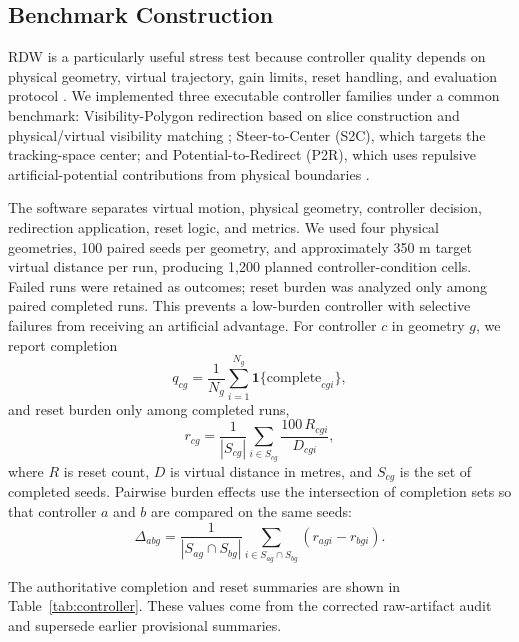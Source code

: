 \subsection{Benchmark Construction}
RDW is a particularly useful stress test because controller quality depends on physical geometry, virtual trajectory, gain limits, reset handling, and evaluation protocol \cite{Li2022RDWReview,Fan2023RDWReview}. We implemented three executable controller families under a common benchmark: Visibility-Polygon redirection based on slice construction and physical/virtual visibility matching \cite{Williams2021VisibilityPolygons}; Steer-to-Center (S2C), which targets the tracking-space center; and Potential-to-Redirect (P2R), which uses repulsive artificial-potential contributions from physical boundaries \cite{Thomas2019P2R,Bachmann2019APF}.

The software separates virtual motion, physical geometry, controller decision, redirection application, reset logic, and metrics. We used four physical geometries, 100 paired seeds per geometry, and approximately 350 m target virtual distance per run, producing 1,200 planned controller-condition cells. Failed runs were retained as outcomes; reset burden was analyzed only among paired completed runs. This prevents a low-burden controller with selective failures from receiving an artificial advantage. For controller $c$ in geometry $g$, we report completion
\begin{equation}
q_{cg}=\frac{1}{N_g}\sum_{i=1}^{N_g}\mathbf{1}\{\mathrm{complete}_{cgi}\},
\end{equation}
and reset burden only among completed runs,
\begin{equation}
r_{cg}=\frac{1}{|S_{cg}|}\sum_{i\in S_{cg}}\frac{100\,R_{cgi}}{D_{cgi}},
\end{equation}
where $R$ is reset count, $D$ is virtual distance in metres, and $S_{cg}$ is the set of completed seeds. Pairwise burden effects use the intersection of completion sets so that controller $a$ and $b$ are compared on the same seeds:
\begin{equation}
\Delta_{abg}=\frac{1}{|S_{ag}\cap S_{bg}|}\sum_{i\in S_{ag}\cap S_{bg}}(r_{agi}-r_{bgi}).
\end{equation}

The authoritative completion and reset summaries are shown in Table~\ref{tab:controller}. These values come from the corrected raw-artifact audit and supersede earlier provisional summaries.

